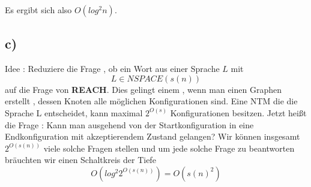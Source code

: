 \documentclass{article}
\begin{document}
				Es ergibt sich also $O(log^2 n)$.
		\subsection*{c)}
				Idee : Reduziere die Frage , ob ein Wort aus einer Sprache $L$ mit \[L\in NSPACE(s(n))\] auf die Frage von \textbf{REACH}. Dies gelingt einem , wenn man einen Graphen erstellt , dessen Knoten alle möglichen Konfigurationen sind. Eine NTM die die Sprache L entscheidet, kann maximal $2^{O(s)}$ Konfigurationen besitzen. Jetzt heißt die Frage : Kann man ausgehend von der Startkonfiguration in eine Endkonfiguration mit akzeptierendem Zustand gelangen? Wir können insgesamt $2^{O(s(n))}$ viele solche Fragen stellen und um jede solche Frage zu beantworten bräuchten wir einen Schaltkreis der Tiefe \[O(log^2 2^{O(s(n))}) = O(s(n)^2)\]
\end{document}

